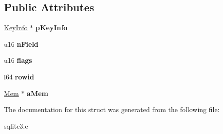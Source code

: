 \subsection*{Public Attributes}
\begin{DoxyCompactItemize}
\item 
\hypertarget{struct_unpacked_record_aeb43e7a1e300857cab2cbe98eacd575b}{\hyperlink{struct_key_info}{Key\-Info} $\ast$ {\bfseries p\-Key\-Info}}\label{struct_unpacked_record_aeb43e7a1e300857cab2cbe98eacd575b}

\item 
\hypertarget{struct_unpacked_record_a2c5062735cdbc5039679d255cc900668}{u16 {\bfseries n\-Field}}\label{struct_unpacked_record_a2c5062735cdbc5039679d255cc900668}

\item 
\hypertarget{struct_unpacked_record_a133514faed51f2eda9a26b838fe2c21d}{u16 {\bfseries flags}}\label{struct_unpacked_record_a133514faed51f2eda9a26b838fe2c21d}

\item 
\hypertarget{struct_unpacked_record_a5ec2064b28fcf43b46bf92a515e9203e}{i64 {\bfseries rowid}}\label{struct_unpacked_record_a5ec2064b28fcf43b46bf92a515e9203e}

\item 
\hypertarget{struct_unpacked_record_a3299c322ceb8b758dacc59701021ae9f}{\hyperlink{struct_mem}{Mem} $\ast$ {\bfseries a\-Mem}}\label{struct_unpacked_record_a3299c322ceb8b758dacc59701021ae9f}

\end{DoxyCompactItemize}


The documentation for this struct was generated from the following file\-:\begin{DoxyCompactItemize}
\item 
sqlite3.\-c\end{DoxyCompactItemize}
